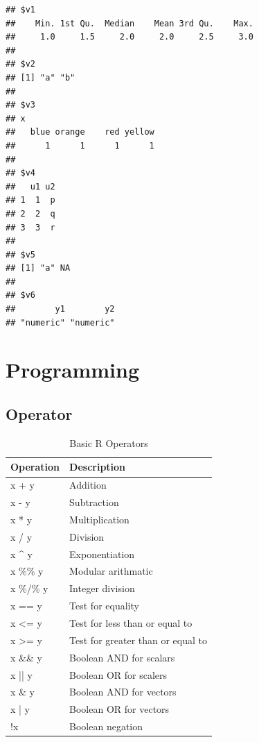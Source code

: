\documentclass[]{book}
\theoremstyle{definition}
\theoremstyle{definition}
\theoremstyle{remark}
\begin{document}
\begin{verbatim}
## $v1
##    Min. 1st Qu.  Median    Mean 3rd Qu.    Max. 
##     1.0     1.5     2.0     2.0     2.5     3.0 
## 
## $v2
## [1] "a" "b"
## 
## $v3
## x
##   blue orange    red yellow 
##      1      1      1      1 
## 
## $v4
##   u1 u2
## 1  1  p
## 2  2  q
## 3  3  r
## 
## $v5
## [1] "a" NA 
## 
## $v6
##        y1        y2 
## "numeric" "numeric"
\end{verbatim}

\section{Programming}\label{programming}

\subsection{Operator}\label{operator}

\begin{table}

\caption{\label{tab:unnamed-chunk-20}Basic R Operators}
\centering
\begin{tabular}[t]{l|l}
\hline
Operation & Description\\
\hline
x + y & Addition\\
\hline
x - y & Subtraction\\
\hline
x * y & Multiplication\\
\hline
x / y & Division\\
\hline
x \textasciicircum{} y & Exponentiation\\
\hline
x \%\% y & Modular arithmatic\\
\hline
x \%/\% y & Integer division\\
\hline
x == y & Test for equality\\
\hline
x <= y & Test for less than or equal to\\
\hline
x >= y & Test for greater than or equal to\\
\hline
x \&\& y & Boolean AND for scalars\\
\hline
x || y & Boolean OR for scalers\\
\hline
x \& y & Boolean AND for vectors\\
\hline
x | y & Boolean OR for vectors\\
\hline
!x & Boolean negation\\
\hline
\end{tabular}
\end{table}
\end{document}
